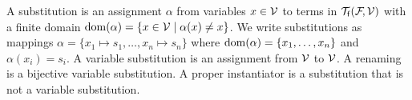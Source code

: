 
\begin{definition}\label{def:substitution}
	A {\myem substitution} is an assignment $\alpha$ from variables $x\in{\mathcal V}$ to terms in ${{\mathcal T}_{\mathsf f}({\mathcal F}\!,{\mathcal V})}$
	with a finite {\myem domain} $\operatorname{dom}(\alpha) = \{ x\in{\mathcal V}\mid\alpha(x) \neq x \}$.
	We write substitutions as mappings $\alpha=\{ x_1\mapsto s_1,\ldots,x_n\mapsto s_n \}$
	where $\operatorname{dom}(\alpha)=\{ x_1,\ldots,x_n \}$ and $\alpha(x_i)=s_i$.
	A {\myem variable substitution} is an assignment from ${\mathcal V}$ to ${\mathcal V}$.
	A {\myem renaming} is a bijective variable substitution.
	A {\myem proper instantiator} is a substitution that is not a variable substitution.
\end{definition}